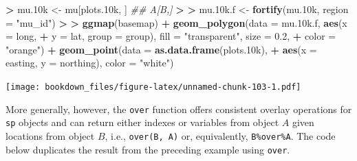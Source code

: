 \documentclass[]{krantz}
\makeatletter
\newenvironment{Shaded}{\begin{snugshade}}{\end{snugshade}}
\newcommand{\CommentTok}[1]{\textcolor[rgb]{0.37,0.37,0.37}{\textit{#1}}}
\newcommand{\DataTypeTok}[1]{\textcolor[rgb]{0.27,0.27,0.27}{#1}}
\newcommand{\ErrorTok}[1]{\textcolor[rgb]{0.14,0.14,0.14}{\textbf{#1}}}
\newcommand{\FloatTok}[1]{\textcolor[rgb]{0.06,0.06,0.06}{#1}}
\newcommand{\KeywordTok}[1]{\textcolor[rgb]{0.27,0.27,0.27}{\textbf{#1}}}
\newcommand{\NormalTok}[1]{#1}
\newcommand{\OperatorTok}[1]{\textcolor[rgb]{0.43,0.43,0.43}{\textbf{#1}}}
\newcommand{\StringTok}[1]{\textcolor[rgb]{0.5,0.5,0.5}{#1}}
\newenvironment{kframe}{%
\medskip{}
\setlength{\fboxsep}{.8em}
 \def\at@end@of@kframe{}%
 \ifinner\ifhmode%
  \def\at@end@of@kframe{\end{minipage}}%
  \begin{minipage}{\columnwidth}%
 \fi\fi%
 \def\FrameCommand##1{\hskip\@totalleftmargin \hskip-\fboxsep
 \colorbox{shadecolor}{##1}\hskip-\fboxsep
     \hskip-\linewidth \hskip-\@totalleftmargin \hskip\columnwidth}%
 \MakeFramed {\advance\hsize-\width
   \@totalleftmargin\z@ \linewidth\hsize
   \@setminipage}}%
 {\par\unskip\endMakeFramed%
 \at@end@of@kframe}
\renewenvironment{Shaded}{\begin{kframe}}{\end{kframe}}
\makeatother
\begin{document}
\begin{Shaded}
\begin{Highlighting}[]
\OperatorTok{>}\StringTok{ }\NormalTok{mu}\FloatTok{.10}\NormalTok{k <-}\StringTok{ }\NormalTok{mu[plots}\FloatTok{.10}\NormalTok{k, ]  }\CommentTok{## A[B,]}
\OperatorTok{>}\StringTok{ }
\ErrorTok{>}\StringTok{ }\NormalTok{mu}\FloatTok{.10}\NormalTok{k.f <-}\StringTok{ }\KeywordTok{fortify}\NormalTok{(mu}\FloatTok{.10}\NormalTok{k, }\DataTypeTok{region =} \StringTok{"mu_id"}\NormalTok{)}
\OperatorTok{>}\StringTok{ }
\ErrorTok{>}\StringTok{ }\KeywordTok{ggmap}\NormalTok{(basemap) }\OperatorTok{+}\StringTok{ }\KeywordTok{geom_polygon}\NormalTok{(}\DataTypeTok{data =}\NormalTok{ mu}\FloatTok{.10}\NormalTok{k.f, }\KeywordTok{aes}\NormalTok{(}\DataTypeTok{x =}\NormalTok{ long, }
\OperatorTok{+}\StringTok{   }\DataTypeTok{y =}\NormalTok{ lat, }\DataTypeTok{group =}\NormalTok{ group), }\DataTypeTok{fill =} \StringTok{"transparent"}\NormalTok{, }\DataTypeTok{size =} \FloatTok{0.2}\NormalTok{, }
\OperatorTok{+}\StringTok{   }\DataTypeTok{color =} \StringTok{"orange"}\NormalTok{) }\OperatorTok{+}\StringTok{ }\KeywordTok{geom_point}\NormalTok{(}\DataTypeTok{data =} \KeywordTok{as.data.frame}\NormalTok{(plots}\FloatTok{.10}\NormalTok{k), }
\OperatorTok{+}\StringTok{   }\KeywordTok{aes}\NormalTok{(}\DataTypeTok{x =}\NormalTok{ easting, }\DataTypeTok{y =}\NormalTok{ northing), }\DataTypeTok{color =} \StringTok{"white"}\NormalTok{)}
\end{Highlighting}
\end{Shaded}

\texttt{[image: bookdown\_files/figure-latex/unnamed-chunk-103-1.pdf]}

More generally, however, the \texttt{over} function offers consistent overlay operations for \texttt{sp} objects and can return either indexes or variables from object \(A\) given locations from object \(B\), i.e., \texttt{over(B,\ A)} or, equivalently, \texttt{B\%over\%A}. The code below duplicates the result from the preceding example using \texttt{over}.

\begin{Shaded}
\end{Shaded}
\end{document}
